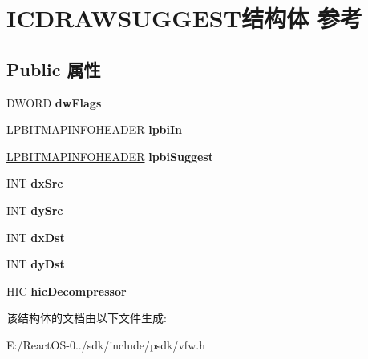\hypertarget{struct_i_c_d_r_a_w_s_u_g_g_e_s_t}{}\section{I\+C\+D\+R\+A\+W\+S\+U\+G\+G\+E\+S\+T结构体 参考}
\label{struct_i_c_d_r_a_w_s_u_g_g_e_s_t}
\subsection*{Public 属性}
\begin{DoxyCompactItemize}
\item 
\mbox{\label{struct_i_c_d_r_a_w_s_u_g_g_e_s_t_a53671b267ca0055dc446fcc31c911a2d}} 
D\+W\+O\+RD {\bfseries dw\+Flags}
\item 
\mbox{\label{struct_i_c_d_r_a_w_s_u_g_g_e_s_t_acc557524a6b7912ebeb1b8114f460897}} 
\hyperlink{struct_b_i_t_m_a_p_i_n_f_o_h_e_a_d_e_r}{L\+P\+B\+I\+T\+M\+A\+P\+I\+N\+F\+O\+H\+E\+A\+D\+ER} {\bfseries lpbi\+In}
\item 
\mbox{\label{struct_i_c_d_r_a_w_s_u_g_g_e_s_t_af8a8557eaffc1d16674d00c2880b8636}} 
\hyperlink{struct_b_i_t_m_a_p_i_n_f_o_h_e_a_d_e_r}{L\+P\+B\+I\+T\+M\+A\+P\+I\+N\+F\+O\+H\+E\+A\+D\+ER} {\bfseries lpbi\+Suggest}
\item 
\mbox{\label{struct_i_c_d_r_a_w_s_u_g_g_e_s_t_a8bd34c04845a8763e88c0ccb2bfe8c9f}} 
I\+NT {\bfseries dx\+Src}
\item 
\mbox{\label{struct_i_c_d_r_a_w_s_u_g_g_e_s_t_a210331fab56c31ed161054f9f0c03a48}} 
I\+NT {\bfseries dy\+Src}
\item 
\mbox{\label{struct_i_c_d_r_a_w_s_u_g_g_e_s_t_af3991479e60f0c8917003e70604e3211}} 
I\+NT {\bfseries dx\+Dst}
\item 
\mbox{\label{struct_i_c_d_r_a_w_s_u_g_g_e_s_t_af74a6e40fdf36f98e0175b1e2fb73620}} 
I\+NT {\bfseries dy\+Dst}
\item 
\mbox{\label{struct_i_c_d_r_a_w_s_u_g_g_e_s_t_ae4f300f5bbe5be22dc3a789e85d85c77}} 
H\+IC {\bfseries hic\+Decompressor}
\end{DoxyCompactItemize}


该结构体的文档由以下文件生成\+:\begin{DoxyCompactItemize}
\item 
E\+:/\+React\+O\+S-\/0../sdk/include/psdk/vfw.\+h\end{DoxyCompactItemize}
